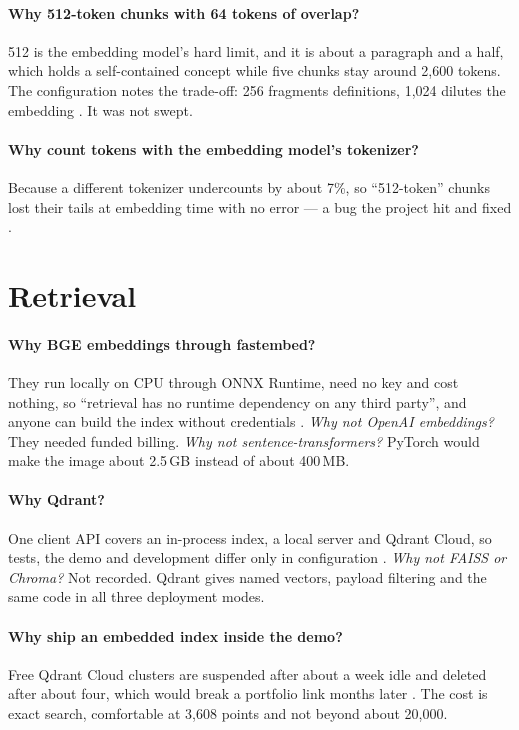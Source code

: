 \paragraph{Why 512-token chunks with 64 tokens of overlap?} 512 is the embedding model's hard limit, and it is about a paragraph and a half, which holds a self-contained concept while five chunks stay around 2,600 tokens. The configuration notes the trade-off: 256 fragments definitions, 1,024 dilutes the embedding . It was not swept.

\paragraph{Why count tokens with the embedding model's tokenizer?} Because a different tokenizer undercounts by about 7\%, so \enquote{512-token} chunks lost their tails at embedding time with no error --- a bug the project hit and fixed .

\section{Retrieval}

\paragraph{Why BGE embeddings through fastembed?} They run locally on CPU through ONNX Runtime, need no key and cost nothing, so \enquote{retrieval has no runtime dependency on any third party}, and anyone can build the index without credentials . \emph{Why not OpenAI embeddings?} They needed funded billing. \emph{Why not sentence-transformers?} PyTorch would make the image about 2.5\,GB instead of about 400\,MB.

\paragraph{Why Qdrant?} One client API covers an in-process index, a local server and Qdrant Cloud, so tests, the demo and development differ only in configuration . \emph{Why not FAISS or Chroma?} Not recorded. \tagI Qdrant gives named vectors, payload filtering and the same code in all three deployment modes.

\paragraph{Why ship an embedded index inside the demo?} Free Qdrant Cloud clusters are suspended after about a week idle and deleted after about four, which would break a portfolio link months later . The cost is exact search, comfortable at 3,608 points and not beyond about 20,000.

